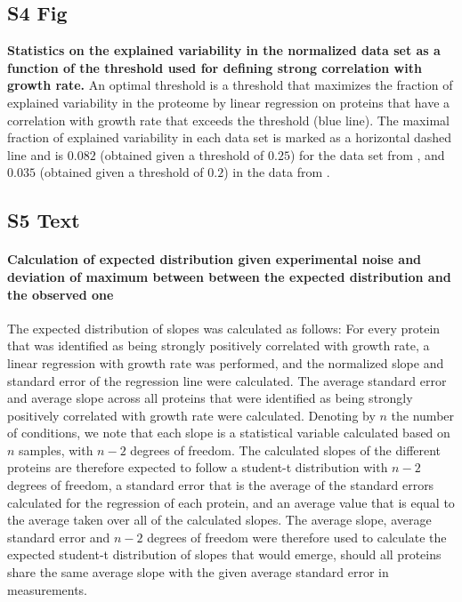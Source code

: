 \documentclass[10pt,letterpaper]{article}
\newcommand{\hMaxExpVar}{0.082}
\newcommand{\vnMaxExpVar}{0.035}
\newcommand{\vMaxExpVar}{\vnMaxExpVar{}}
\begin{document}
\subsection*{S4 Fig}
\label{fig:threshold}
    {\bf Statistics on the explained variability in the normalized data set as a function of the threshold used for defining strong correlation with growth rate.}
  An optimal threshold is a threshold that maximizes the fraction of explained variability in the proteome by linear regression on proteins that have a correlation with growth rate that exceeds the threshold (blue line).
  The maximal fraction of explained variability in each data set is marked as a horizontal dashed line and is $\hMaxExpVar{}$ (obtained given a threshold of $0.25$) for the data set from \cite{Schmidt2015}, and $\vMaxExpVar{}$ (obtained given a threshold of $0.2$) in the data from \cite{Peebo_2015}.
%

\subsection*{S5 Text}
\label{slopedistexp}
\paragraph{Calculation of expected distribution given experimental noise and deviation of maximum between between the expected distribution and the observed one}
The expected distribution of slopes was calculated as follows:
For every protein that was identified as being strongly positively correlated with growth rate, a linear regression with growth rate was performed, and the normalized slope and standard error of the regression line were calculated.
The average standard error and average slope across all proteins that were identified as being strongly positively correlated with growth rate were calculated.
Denoting by $n$ the number of conditions, we note that each slope is a statistical variable calculated based on $n$ samples, with $n-2$ degrees of freedom.
The calculated slopes of the different proteins are therefore expected to follow a student-t distribution with $n-2$ degrees of freedom, a standard error that is the average of the standard errors calculated for the regression of each protein, and an average value that is equal to the average taken over all of the calculated slopes.
The average slope, average standard error and $n-2$ degrees of freedom were therefore used to calculate the expected student-t distribution of slopes that would emerge, should all proteins share the same average slope with the given average standard error in measurements.
\end{document}
